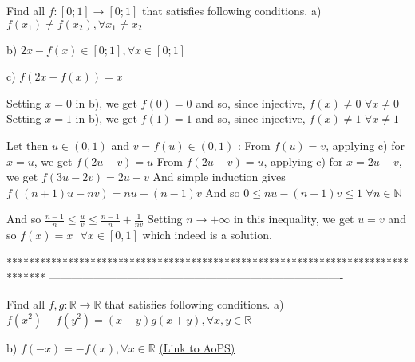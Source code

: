 \begin{solution}
	\begin{tcolorbox}Find all $f:\left [ 0;1 \right ]\rightarrow \left [ 0;1 \right ]    $   that satisfies following conditions.
a) $f\left ( x_{1} \right )\neq f\left ( x_{2} \right ),\forall x_{1} \neq x_{2}$

b) $2x-f(x)\in \left [ 0;1 \right ],\forall x\in \left [ 0;1 \right ]$

c) $ f\left ( 2x-f\left ( x \right ) \right )=x$\end{tcolorbox}
Setting $x=0$ in b), we get $f(0)=0$ and so, since injective, $f(x)\ne 0$ $\forall x\ne 0$
Setting $x=1$ in b), we get $f(1)=1$ and so, since injective, $f(x)\ne 1$ $\forall x\ne 1$

Let then $u\in(0,1)$ and $v=f(u)\in(0,1)$ :
From $f(u)=v$, applying c) for $x=u$, we get $f(2u-v)=u$
From $f(2u-v)=u$, applying c) for $x=2u-v$, we get $f(3u-2v)=2u-v$
And simple induction gives $f((n+1)u-nv)=nu-(n-1)v$
And so $0\le nu-(n-1)v\le 1$ $\forall n\in\mathbb N$

And so $\frac{n-1}n\le \frac uv \le \frac{n-1}n+\frac 1{nv}$
Setting $n\to+\infty$ in this inequality, we get $u=v$ and so $\boxed{f(x)=x\text{  }\forall x\in[0,1]}$ which indeed is a solution.
\end{solution}
*******************************************************************************
-------------------------------------------------------------------------------

\begin{problem}
	Find all $ f,g: \mathbb{R}\rightarrow \mathbb{R} $   that satisfies following conditions.
a) $f(x^{2})-f(y^{2})=\left ( x-y \right )g\left ( x+y \right ),\forall x,y\in \mathbb{R}$

b) $f(-x)=-f(x),\forall x\in \mathbb{R}$
	\flushright \href{https://artofproblemsolving.com/community/c6h618328}{(Link to AoPS)}
\end{problem}



